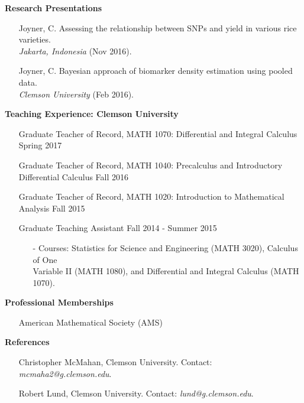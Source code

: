 \documentclass[10pt]{article}
\begin{document}
\noindent
\textbf{Research Presentations}
\vspace{-0.25cm}
\begin{itemize}
\item[] Joyner, C. Assessing the relationship between SNPs and yield in various rice varieties. \\
\emph{Jakarta, Indonesia} (Nov 2016).
\vspace{-0.25cm}
\item[] Joyner, C. Bayesian approach of biomarker density estimation using pooled data. \\
\emph{Clemson University} (Feb 2016).
\end{itemize}

\noindent
\textbf{Teaching Experience: Clemson University}
\vspace{-0.25cm}
\begin{itemize}
\item[] Graduate Teacher of Record, MATH 1070: Differential and Integral Calculus \hfill Spring 2017
\vspace{-0.25cm}
\item[] Graduate Teacher of Record, MATH 1040: Precalculus and Introductory Differential Calculus \hfill Fall 2016
\vspace{-0.25cm}
\item[] Graduate Teacher of Record, MATH 1020: Introduction to Mathematical Analysis \hfill Fall 2015
\vspace{-0.25cm}
\item[] Graduate Teaching Assistant \hfill Fall 2014 - Summer 2015
\vspace{-0.25cm}
\begin{itemize}
\item[-] Courses: Statistics for Science and Engineering (MATH 3020), Calculus of One \\ Variable II (MATH 1080), and Differential and Integral Calculus (MATH 1070).
\end{itemize}
\end{itemize}

\noindent
\textbf{Professional Memberships}
\vspace{-0.25cm}
\begin{itemize}
\item[] American Mathematical Society (AMS)
\end{itemize}

\noindent
\textbf{References}
\vspace{-0.25cm}
\begin{itemize}
\item[] Christopher McMahan, Clemson University. Contact: \emph{mcmaha2@g.clemson.edu}.
\vspace{-0.25cm}
\item[] Robert Lund, Clemson University. Contact: \emph{lund@g.clemson.edu}.
\end{itemize}
\end{document}
